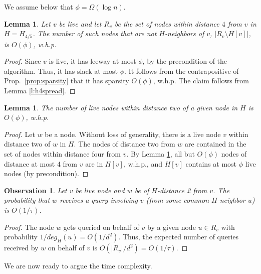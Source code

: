 \documentclass[12pt]{article}
\newtheorem{lemma}[theorem]{Lemma}
\newtheorem{observation}[theorem]{Observation}
\begin{document}
We assume below that $\phi = \Omega(\log n)$. 

\begin{lemma}
Let $v$ be live and let $R_v$ be the set of nodes within distance $4$ from $v$ in $H = H_{4/5}$. The number of such nodes that are not $H$-neighbors of $v$, $|R_v \setminus H[v]|$, is $O(\phi)$, w.h.p.
\label{l:h4set}
\end{lemma}
%
\begin{proof}
Since $v$ is live, it has leeway at most $\phi$, by
the precondition of the algorithm. Thus, it has slack at most $\phi$.
It follows from the contrapositive of Prop.~\ref{prop:sparsity} that it has sparsity $O(\phi)$, w.h.p.
The claim follows from Lemma \ref{l:h4spread}.
\end{proof}

\begin{lemma}
The number of live nodes within distance two of a given node in $H$ is $O(\phi)$, w.h.p.
\label{l:live2}
\end{lemma}

\begin{proof}
Let $w$ be a node. Without loss of generality, there is a live node $v$ within distance two of $w$ in $H$. The nodes of distance two from $w$ are contained in the set of nodes within distance four from $v$.
By Lemma \ref{l:h4set}, all but $O(\phi)$ nodes of distance at most 4 from $v$ are in $H[v]$, w.h.p., and $H[v]$ contains at most $\phi$ live nodes (by precondition). 
\end{proof}


\begin{observation}
Let $v$ be live node and $w$ be of $H$-distance 2 from $v$.
The probability that $w$ receives a query involving $v$ (from some common $H$-neighbor $u$) is $O(1/\tau)$.
\label{obs:reqprob}
\end{observation}

\begin{proof}
 The node $w$ gets queried on behalf of $v$ by a given node $u \in R_v$  with probability $1/deg_H(u) = O(1/d^2)$. Thus, the expected number of queries received by $w$ on behalf of $v$ is $O(|R_v|/d^2) = O(1/\tau)$. 
\end{proof}

We are now ready to argue the time complexity.
\end{document}
